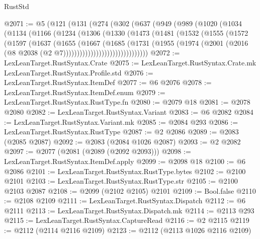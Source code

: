 \begin{lexlean}{RustStd}
\begin{coremodule}
@2071 := @5
    (@121
      (@131
        (@274
          (@302
            (@637
              (@949
                (@989
                  (@1020
                    (@1034
                      (@1134
                        (@1166
                          (@1234
                            (@1306
                              (@1330
                                (@1473
                                  (@1481
                                    (@1532
                                      (@1555
                                        (@1572
                                          (@1597
                                            (@1637
                                              (@1655
                                                (@1667
                                                  (@1685
                                                    (@1731
                                                      (@1955
                                                        (@1974
                                                          (@2001
                                                            (@2016
                                                              (@8
                                                                @2038
                                                                (@2
                                                                  @7)))))))))))))))))))))))))))))))
@2072 := LexLeanTarget.RustSyntax.Crate
@2075 := LexLeanTarget.RustSyntax.Crate.mk LexLeanTarget.RustSyntax.Profile.std
@2076 := LexLeanTarget.RustSyntax.ItemDef
@2077 := @6 @2076
@2078 := LexLeanTarget.RustSyntax.ItemDef.enum
@2079 := LexLeanTarget.RustSyntax.RustType.fn
@2080 := @2079 @18
@2081 := @2078 @2080
@2082 := LexLeanTarget.RustSyntax.Variant
@2083 := @6 @2082
@2084 := LexLeanTarget.RustSyntax.Variant.mk
@2085 := @2084 @293
@2086 := LexLeanTarget.RustSyntax.RustType
@2087 := @2 @2086
@2089 := @2083 (@2085 @2087)
@2092 := @2083 (@2084 @1026 @2087)
@2093 := @2 @2082
@2097 := @2077 (@2081 (@2089 (@2092 @2093)))
@2098 := LexLeanTarget.RustSyntax.ItemDef.apply
@2099 := @2098 @18
@2100 := @6 @2086
@2101 := LexLeanTarget.RustSyntax.RustType.bytes
@2102 := @2100 @2101
@2103 := LexLeanTarget.RustSyntax.RustType.str
@2105 := @2100 @2103 @2087
@2108 := @2099 (@2102 @2105) @2101
@2109 := Bool.false
@2110 := @2108 @2109
@2111 := LexLeanTarget.RustSyntax.Dispatch
@2112 := @6 @2111
@2113 := LexLeanTarget.RustSyntax.Dispatch.mk
@2114 := @2113 @293
@2115 := LexLeanTarget.RustSyntax.CaptureRead
@2116 := @2 @2115
@2119 := @2112 (@2114 @2116 @2109)
@2123 := @2112 (@2113 @1026 @2116 @2109)

\end{coremodule}
\end{lexlean}
